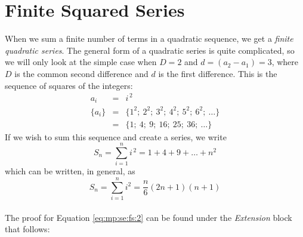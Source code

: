 \section{Finite Squared Series}
When we sum a finite number of terms in a quadratic sequence, we get a \textit{finite
quadratic series}. The general form of a quadratic series is quite complicated,
so we will only look at the simple case when $D=2$ and $d=(a_2 - a_1)=3$, where $D$ is the common second difference and $d$ is the first difference. This is the sequence of squares of the integers:
\begin{eqnarray*}
\label{eq:mp:se:quad:seq}
a_i &=& i^{\,2} \\
\{a_i\} &=& \{1^2; \: 2^2; \: 3^2; \: 4^2; \: 5^2; \: 6^2; \: \ldots \} \\
&=& \{1; \: 4; \: 9; \: 16; \: 25; \: 36; \: \ldots \}
\end{eqnarray*}
If we wish to sum this sequence and create a series, we write
\begin{equation*}
\label{eq:mp:se:fs:sum}
S_n=\sum_{i=1}^n i^{\,2} = 1 + 4 + 9 + \ldots + n^2
\end{equation*}
which can be written, in general, as
\begin{equation}
\label{eq:mp:se:fs:2}
\boxed{S_n = \sum_{i=1}^n i^2 = \frac{n}{6}(2n + 1)(n + 1)}
\end{equation}
\\
The proof for Equation \eqref{eq:mp:se:fs:2} can be found under the \textit{Extension} block that follows:
\\
